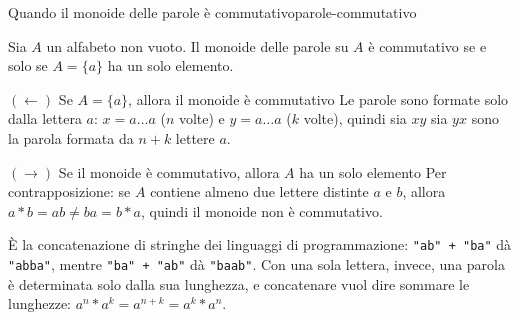 \begin{concetto}
\begin{Proposizione}{Quando il monoide delle parole è commutativo}{parole-commutativo}
    \begin{prerequisiti}
    \end{prerequisiti}
    Sia $A$ un alfabeto non vuoto. Il monoide delle parole su $A$ è commutativo se e solo se $A = \{a\}$ ha un solo elemento.
\end{Proposizione}
\begin{dimostrazione}
    \begin{caso}{$(\leftarrow)$ Se $A = \{a\}$, allora il monoide è commutativo}
        Le parole sono formate solo dalla lettera $a$: $x = a \dots a$ ($n$ volte) e $y = a \dots a$ ($k$ volte), quindi sia
        $xy$ sia $yx$ sono la parola formata da $n + k$ lettere $a$.
    \end{caso}
    \begin{caso}{$(\rightarrow)$ Se il monoide è commutativo, allora $A$ ha un solo elemento}
        Per contrapposizione: se $A$ contiene almeno due lettere distinte $a$ e $b$, allora $a * b = ab \neq ba = b * a$,
        quindi il monoide non è commutativo.
    \end{caso}
\end{dimostrazione}
\end{concetto}

\begin{spiegazione}
    È la concatenazione di stringhe dei linguaggi di programmazione: \texttt{"ab" + "ba"} dà \texttt{"abba"}, mentre \texttt{"ba" + "ab"} dà \texttt{"baab"}.
    Con una sola lettera, invece, una parola è determinata solo dalla sua lunghezza, e concatenare vuol dire sommare le lunghezze: $a^n * a^k = a^{n + k} = a^k * a^n$.
\end{spiegazione}



